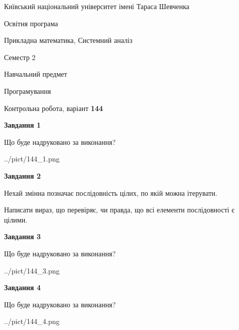 \documentclass[12pt, ukrainian]{article}
\begin{document}
{{\begin {small}\par
{ \center  Київський національний університет імені Тараса Шевченка \par}
{\parbox {5 cm}{Освітня програма \hfill}{\parbox {8 cm}{Прикладна математика, Системний аналіз \hfill}}\parbox {5 cm}{\hfill Семестр 2}}\par
{\parbox {5 cm} {Навчальний предмет \hfill}\parbox {7 cm}{Програмування \hfill}\parbox {6cm}{\hfill}\par}\vspace{-7pt} \end{small}}{\center Контрольна робота, варіант  \No \textbf
{ 144 }\par}}
{
\begin {large}
{\begin {center}\textbf{Завдання 1}\end {center}}\par
Що буде надруковано за виконання?\par\par
\begin{center}
	{../pict/144_1.png}
\end{center}
\newpage

{\begin {center}\textbf{Завдання 2}\end {center}}\par
Нехай змінна  позначає послідовність цілих, по якій можна ітерувати.

Написати вираз, що перевіряє, чи правда, що всі елементи послідовності є цілими.\par
\newpage

{\begin {center}\textbf{Завдання 3}\end {center}}\par
Що буде надруковано за виконання?\par
\begin{center}
	{../pict/144_3.png}
\end{center}
\newpage

{\begin {center}\textbf{Завдання 4}\end {center}}\par
Що буде надруковано за виконання?\par
\begin{center}
	{../pict/144_4.png}
\end{center}
\newpage


\end{large}}
\end{document}
